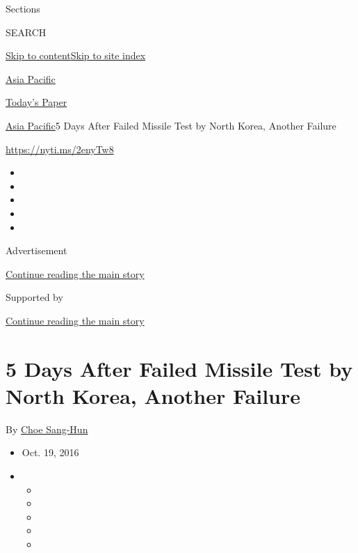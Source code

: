 Sections

SEARCH

\protect\hyperlink{site-content}{Skip to
content}\protect\hyperlink{site-index}{Skip to site index}

\href{https://www.nytimes.com/section/world/asia}{Asia Pacific}

\href{https://myaccount.nytimes.com/auth/login?response_type=cookie\&client_id=vi}{}

\href{https://www.nytimes.com/section/todayspaper}{Today's Paper}

\href{/section/world/asia}{Asia Pacific}\textbar{}5 Days After Failed
Missile Test by North Korea, Another Failure

\url{https://nyti.ms/2enyTw8}

\begin{itemize}
\item
\item
\item
\item
\item
\end{itemize}

Advertisement

\protect\hyperlink{after-top}{Continue reading the main story}

Supported by

\protect\hyperlink{after-sponsor}{Continue reading the main story}

\hypertarget{5-days-after-failed-missile-test-by-north-korea-another-failure}{%
\section{5 Days After Failed Missile Test by North Korea, Another
Failure}\label{5-days-after-failed-missile-test-by-north-korea-another-failure}}

By \href{http://www.nytimes.com/by/choe-sang-hun}{Choe Sang-Hun}

\begin{itemize}
\item
  Oct. 19, 2016
\item
  \begin{itemize}
  \item
  \item
  \item
  \item
  \item
  \end{itemize}
\end{itemize}

